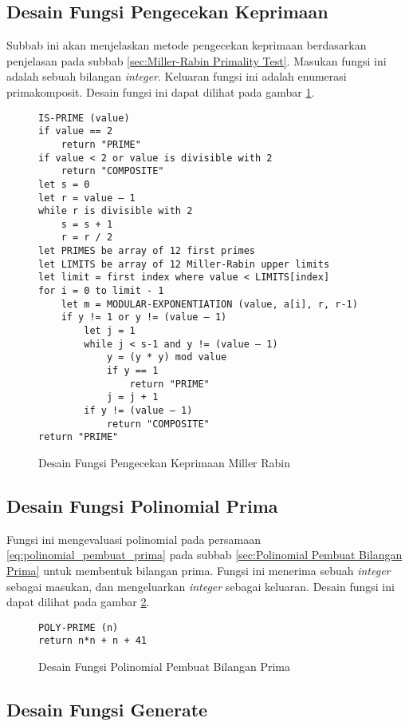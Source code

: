 \subsection{Desain Fungsi Pengecekan Keprimaan}

Subbab ini akan menjelaskan metode pengecekan keprimaan berdasarkan penjelasan pada subbab \ref{sec:Miller-Rabin Primality Test}. Masukan fungsi ini adalah sebuah bilangan \textit{integer}. Keluaran fungsi ini adalah enumerasi prima\textendash komposit. Desain fungsi ini dapat dilihat pada gambar \ref{psdo:miller_rabin}.
\begin{figure}[h!]
\begin{lstlisting}[firstnumber=0]
IS-PRIME (value)
if value == 2
	return "PRIME"
if value < 2 or value is divisible with 2
	return "COMPOSITE"
let s = 0
let r = value – 1
while r is divisible with 2
	s = s + 1
	r = r / 2
let PRIMES be array of 12 first primes
let LIMITS be array of 12 Miller-Rabin upper limits
let limit = first index where value < LIMITS[index]
for i = 0 to limit - 1
	let m = MODULAR-EXPONENTIATION (value, a[i], r, r-1)
	if y != 1 or y != (value – 1)
		let j = 1
		while j < s-1 and y != (value – 1)
			y = (y * y) mod value
			if y == 1
				return "PRIME"
			j = j + 1
		if y != (value – 1)
			return "COMPOSITE"
return "PRIME"
\end{lstlisting}
\caption{Desain Fungsi Pengecekan Keprimaan Miller Rabin}
\label{psdo:miller_rabin}
\end{figure}

\subsection{Desain Fungsi Polinomial Prima}

Fungsi ini mengevaluasi polinomial pada persamaan \eqref{eq:polinomial_pembuat_prima} pada subbab \ref{sec:Polinomial Pembuat Bilangan Prima} untuk membentuk bilangan prima. Fungsi ini menerima sebuah \textit{integer} sebagai masukan, dan mengeluarkan \textit{integer} sebagai keluaran. Desain fungsi ini dapat dilihat pada gambar \ref{psdo:prime_generator_polynomial}.
\begin{figure}[h!]
\begin{lstlisting}[firstnumber=0]
POLY-PRIME (n)
return n*n + n + 41
\end{lstlisting}
\caption{Desain Fungsi Polinomial Pembuat Bilangan Prima}
\label{psdo:prime_generator_polynomial}
\end{figure}

\subsection{Desain Fungsi Generate}

